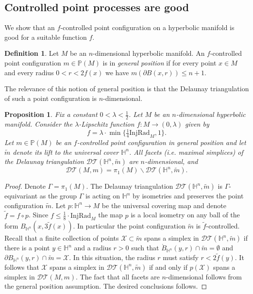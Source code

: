 \documentclass{amsart}
\newcommand{\HH}{\mathbb{H}}
\newcommand{\Points}{\mathbb{P}}
\newcommand{\DelanComplex}{\mathcal{DT}}
\theoremstyle{plain}
\newtheorem{prop}[theorem]{Proposition}
\numberwithin{equation}{section}
\theoremstyle{definition}
\newtheorem{definition}[theorem]{Definition}
\begin{document}
\subsection{Controlled point processes are good}
We  show that an $f$-controlled point configuration on a hyperbolic manifold is good for a suitable function $f$.

\begin{definition}
Let $M$ be an $n$-dimensional hyperbolic manifold. An $f$-controlled point configuration $m \in \Points(M)$ is in \emph{general position} if for every point $x \in M$ and every radius $0 < r < 2f(x)$ we have $m(\partial B(x,r)) \le n+1$.
\end{definition}

The relevance of this notion of general position is that the Delaunay triangulation of such a point configuration is $n$-dimensional.

\begin{prop}
\label{prop:universal cover}
Fix a constant $0 < \lambda < \frac{1}{2}$. Let $M$ be an $n$-dimensional hyperbolic manifold. Consider the $\lambda$-Lipschitz function  $f : M \to \left(0,\lambda\right)$ given by 
$$
f = \lambda \cdot \min\{\tfrac{1}{4} \mathrm{InjRad}_M,1\}.
$$
Let $m \in \Points(M)$ be an $f$-controlled point configuration in general position and let $\widetilde m$ denote its lift to the universal cover $\HH^n$. All facets (i.e. maximal simplices) of the Delaunay triangulation $\DelanComplex(\HH^n,\widetilde m)$ are $n$-dimensional, and  $$\DelanComplex(M,m) = \pi_1(M) \backslash \DelanComplex(\HH^n,\widetilde m).$$
\end{prop}
\begin{proof}
Denote $\Gamma = \pi_1(M)$. The Delaunay triangulation $\DelanComplex(\HH^n,\widetilde m)$ is $\Gamma$-equivariant  as the group $\Gamma$ is acting on $\HH^n$ by isometries and preserves the point configuration $\widetilde m$. Let $p : \HH^n \to M$ be the universal covering map and denote $\widetilde f = f \circ p$. Since $f \le \frac{1}{8} \cdot\mathrm{InjRad}_M$ the map $p$ is a local isometry on any ball of the form $B_{\HH^n}(x,3\widetilde f(x))$. In particular the point configuration $\widetilde m$ is $\widetilde f$-controlled.
Recall that a finite collection of points $\mathcal{X} \subset \widetilde m$ spans a simplex in $\DelanComplex(\HH^n,\widetilde m)$ if there is a point $y \in \HH^n$ and a radius $r > 0 $ such that $\mathring B_{\HH^n}(y,r) \cap \widetilde m = \emptyset$ and $\partial  B_{\HH^n}(y,r) \cap \widetilde m = \mathcal{X}$. In this situation, the radius $r$ must satisfy $r < 2\widetilde f(y)$. It follows that $\mathcal{X}$ spans a simplex in $\DelanComplex(\HH^n,\widetilde m)$ if and only if $p(\mathcal{X})$ spans a simplex in $\DelanComplex(M,m)$. The fact that all facets are $n$-dimensional follows from the general position assumption. The desired conclusions follows.
\end{proof}
\end{document}
